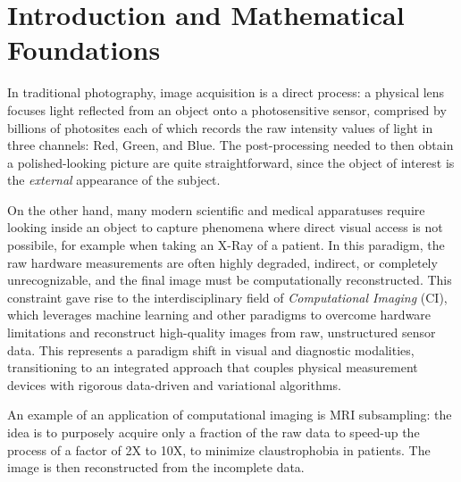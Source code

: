 \section{Introduction and Mathematical Foundations}
In traditional photography, image acquisition is a direct process: a physical lens focuses light reflected from an object onto a photosensitive sensor, comprised by billions of photosites each of which records the raw intensity values of light in three channels: Red, Green, and Blue. The post-processing needed to then obtain a polished-looking picture are quite straightforward, since the object of interest is the \textit{external} appearance of the subject.

On the other hand, many modern scientific and medical apparatuses require looking inside an object to capture phenomena where direct visual access is not possibile, for example when taking an X-Ray of a patient. In this paradigm, the raw hardware measurements are often highly degraded, indirect, or completely unrecognizable, and the final image must be computationally reconstructed. This constraint gave rise to the interdisciplinary field of \textit{Computational Imaging} (CI), which leverages machine learning and other paradigms to overcome hardware limitations and reconstruct high-quality images from raw, unstructured sensor data. This represents a paradigm shift in visual and diagnostic modalities, transitioning to an integrated approach that couples physical measurement devices with rigorous data-driven and variational algorithms.

An example of an application of computational imaging is MRI subsampling: the idea is to purposely acquire only a fraction of the raw data to speed-up the process of a factor of 2X to 10X, to minimize claustrophobia in patients. The image is then reconstructed from the incomplete data.


